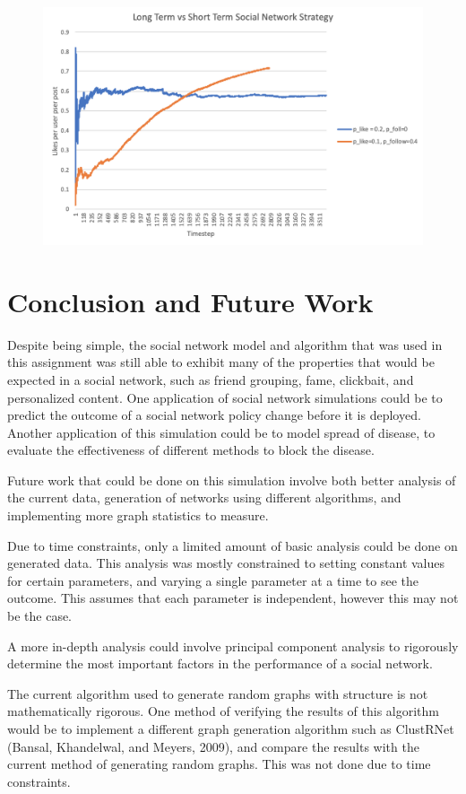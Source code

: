 \documentclass{article}
\begin{document}
\begin{figure}[H]
\centering
\includegraphics[width=\linewidth]{Growth}
\end{figure}

\section{Conclusion and Future Work}
Despite being simple, the social network model and algorithm that was used
in this assignment was still able to exhibit many of the properties
that would be expected in a social network, such as friend grouping,
fame, clickbait, and personalized content.
One application of social network simulations could be to predict the outcome
of a social network policy change before it is deployed.
Another application of this simulation could be to model spread of disease, to evaluate the effectiveness
of different methods to block the disease.

Future work that could be done on this simulation involve both better
analysis of the current data, generation of networks using different algorithms,
and implementing more graph statistics to measure.

Due to time constraints, only a limited amount of basic analysis could be done
on generated data. This analysis was mostly constrained to setting constant values for certain
parameters, and varying a single parameter at a time to see the outcome.
This assumes that each parameter is independent, however this may not be the case.

A more in-depth analysis could involve principal component analysis to rigorously
determine the most important factors in the performance of a social network.

The current algorithm used to generate random graphs with structure is not mathematically rigorous.
One method of verifying the results of this algorithm would be to implement a different
graph generation algorithm such as ClustRNet (Bansal, Khandelwal, and Meyers, 2009),
and compare the results with the current method of generating random graphs.
This was not done due to time constraints.
\end{document}
